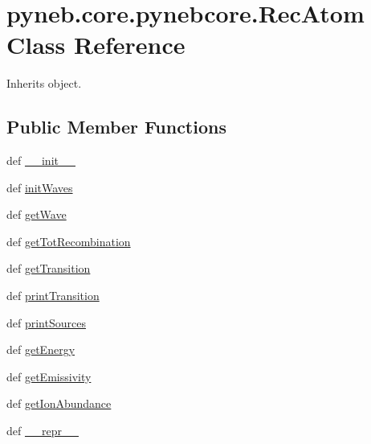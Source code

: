 \hypertarget{classpyneb_1_1core_1_1pynebcore_1_1_rec_atom}{\section{pyneb.\-core.\-pynebcore.\-Rec\-Atom Class Reference}
\label{classpyneb_1_1core_1_1pynebcore_1_1_rec_atom}
}


Inherits object.

\subsection*{Public Member Functions}
\begin{DoxyCompactItemize}
\item 
def \hyperlink{classpyneb_1_1core_1_1pynebcore_1_1_rec_atom_abf13c53bf46bd7330bebd9397b4f8774}{\-\_\-\-\_\-init\-\_\-\-\_\-}
\item 
def \hyperlink{classpyneb_1_1core_1_1pynebcore_1_1_rec_atom_a0ba65ab1a02525bf8ae4c6e0e795db1a}{init\-Waves}
\item 
def \hyperlink{classpyneb_1_1core_1_1pynebcore_1_1_rec_atom_a4c99566f33409cee77076ca8735568f0}{get\-Wave}
\item 
def \hyperlink{classpyneb_1_1core_1_1pynebcore_1_1_rec_atom_ab7e0b11cdc85dade76528fe5de9886c0}{get\-Tot\-Recombination}
\item 
def \hyperlink{classpyneb_1_1core_1_1pynebcore_1_1_rec_atom_abc77497db8e5d888d8424e4a82d50c2e}{get\-Transition}
\item 
def \hyperlink{classpyneb_1_1core_1_1pynebcore_1_1_rec_atom_aea8927d7a4c6e507ad7239760e5b41c8}{print\-Transition}
\item 
def \hyperlink{classpyneb_1_1core_1_1pynebcore_1_1_rec_atom_ae8f411260ec12f4469c43d327750801a}{print\-Sources}
\item 
def \hyperlink{classpyneb_1_1core_1_1pynebcore_1_1_rec_atom_a664340029b0a067b459cae45e13d50c5}{get\-Energy}
\item 
def \hyperlink{classpyneb_1_1core_1_1pynebcore_1_1_rec_atom_ac03957666aff1955387fcc03c6187ad3}{get\-Emissivity}
\item 
def \hyperlink{classpyneb_1_1core_1_1pynebcore_1_1_rec_atom_a250ec6b99eedd84bdb8eae97cbd4beef}{get\-Ion\-Abundance}
\item 
def \hyperlink{classpyneb_1_1core_1_1pynebcore_1_1_rec_atom_ad2f1efa1d2c3e839a9e7db30319cdb82}{\-\_\-\-\_\-repr\-\_\-\-\_\-}
\end{DoxyCompactItemize}
